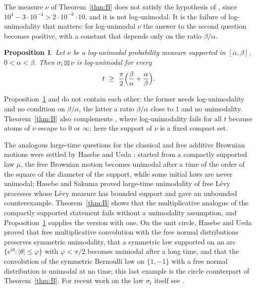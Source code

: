 \documentclass[11pt]{amsart}
\newtheorem{mainprop}[mainthm]{Proposition}
\theoremstyle{remark}
\begin{document}
The measure $\nu$ of Theorem~\ref{thm:B} does not satisfy the hypothesis of \cite[Theorem~4.4]{HUW}, since $10^4-3\cdot10^{-4}>2\cdot10^{-3}\cdot10$, and it is not log-unimodal. It is the failure of log-unimodality that matters: for log-unimodal $\nu$ the answer to the second question becomes positive, with a constant that depends only on the ratio $\beta/\alpha$.

\begin{mainprop}\label{prop:D}
Let $\nu$ be a log-unimodal probability measure supported in $[\alpha,\beta]$, $0<\alpha<\beta$. Then $\sigma_t\boxtimes\nu$ is log-unimodal for every
\[
t\ \ge\ \frac\pi2\Bigl(\frac\beta\alpha+\frac\alpha\beta\Bigr).
\]
\end{mainprop}

Proposition~\ref{prop:D} and \cite[Theorem~4.4]{HUW} do not contain each other: the former needs log-unimodality and no condition on $\beta/\alpha$, the latter a ratio $\beta/\alpha$ close to $1$ and no unimodality. Theorem~\ref{thm:B} also complements \cite[Theorem~4.5]{HUW}, where log-unimodality fails for all $t$ because atoms of $\nu$ escape to $0$ or $\infty$; here the support of $\nu$ is a fixed compact set.

The analogous large-time questions for the classical and free additive Brownian motions were settled by Hasebe and Ueda \cite{HU18}: started from a compactly supported law $\mu$, the free Brownian motion becomes unimodal after a time of the order of the square of the diameter of the support, while some initial laws are never unimodal; Hasebe and Sakuma \cite{HS17} proved large-time unimodality of free L\'evy processes whose L\'evy measure has bounded support and gave an unbounded counterexample. Theorem~\ref{thm:B} shows that the multiplicative analogue of the compactly supported statement fails without a unimodality assumption, and Proposition~\ref{prop:D} supplies the version with one. On the unit circle, Hasebe and Ueda \cite{HU21} proved that free multiplicative convolution with the free normal distributions preserves symmetric unimodality, that a symmetric law supported on an arc $\{e^{i\theta}:|\theta|\le\varphi\}$ with $\varphi<\pi/2$ becomes unimodal after a long time, and that the convolution of the symmetric Bernoulli law on $\{1,-1\}$ with a free normal distribution is unimodal at no time; this last example is the circle counterpart of Theorem~\ref{thm:B}. For recent work on the law $\sigma_t$ itself see \cite{Aue26}.
\end{document}
